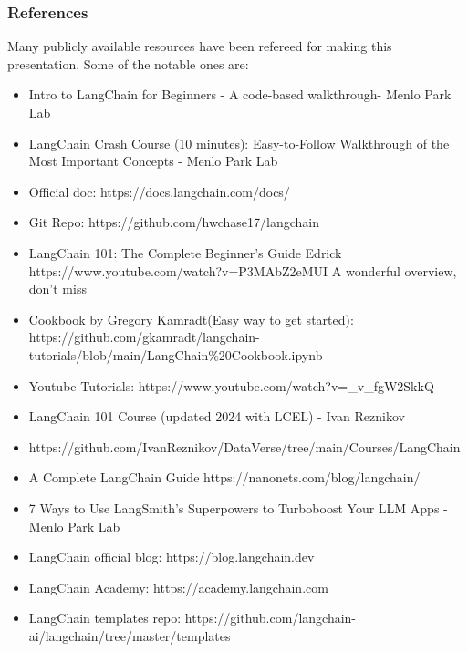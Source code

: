\begin{frame}\frametitle{References}
Many publicly available resources have been refereed for making this presentation. Some of the notable ones are:
\footnotesize
\begin{itemize}
\item Intro to LangChain for Beginners - A code-based walkthrough- Menlo Park Lab
\item LangChain Crash Course (10 minutes): Easy-to-Follow Walkthrough of the Most Important Concepts - Menlo Park Lab
\item Official doc: https://docs.langchain.com/docs/
\item Git Repo: https://github.com/hwchase17/langchain
\item LangChain 101: The Complete Beginner's Guide Edrick https://www.youtube.com/watch?v=P3MAbZ2eMUI A wonderful overview, don't miss
\item Cookbook by Gregory Kamradt(Easy way to get started): https://github.com/gkamradt/langchain-tutorials/blob/main/LangChain\%20Cookbook.ipynb
\item Youtube Tutorials: https://www.youtube.com/watch?v=\_v\_fgW2SkkQ
\item LangChain 101 Course (updated 2024 with LCEL) - Ivan Reznikov
\item https://github.com/IvanReznikov/DataVerse/tree/main/Courses/LangChain
\item A Complete LangChain Guide https://nanonets.com/blog/langchain/
\item 7 Ways to Use LangSmith's Superpowers to Turboboost Your LLM Apps - Menlo Park Lab
\item  LangChain official blog: https://blog.langchain.dev
\item  LangChain Academy: https://academy.langchain.com
\item  LangChain templates repo: https://github.com/langchain-ai/langchain/tree/master/templates
\end{itemize}

\end{frame}